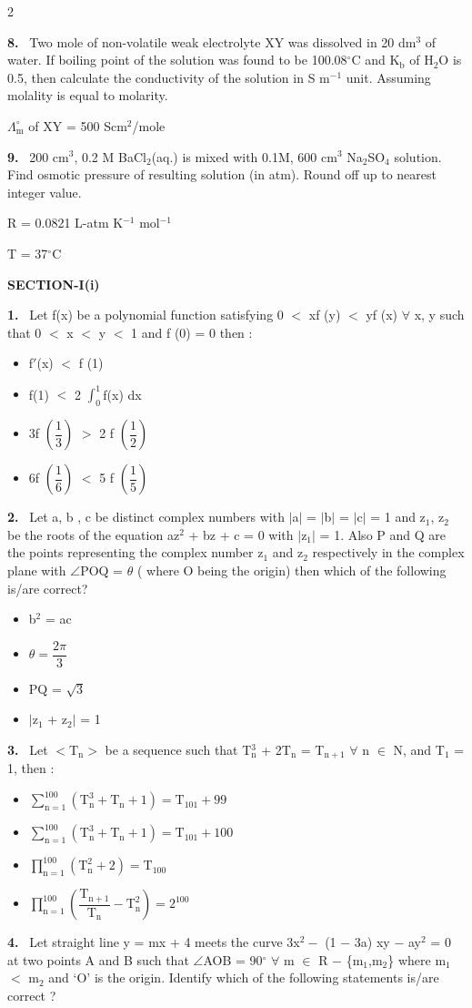 \documentclass[10pt]{extarticle}
\newcommand{\papersec}[1]{\par\bigskip{\centering\Large\bfseries PAPER-#1\par}\medskip}
\newcommand{\partsec}[2]{\par\medskip\noindent{\large\bfseries PART-#1: #2}\par\smallskip}
\newcommand{\sect}[1]{\par\smallskip\noindent\textbf{#1}\par}
\newcommand{\qn}[1]{\par\smallskip\noindent\textbf{#1.}~}
\newenvironment{qoptions}{\begin{itemize}[leftmargin=1.8em,itemsep=1pt,topsep=2pt,label={}]}{\end{itemize}}
\newcommand{\opt}[2]{\item[(#1)] #2}
\begin{document}
\begin{multicols}{2}
\qn{8} Two mole of non-volatile weak electrolyte XY was dissolved in 20 dm$^3$ of water. If boiling point of the solution was found to be 100.08$^\circ$C and K$_\mathrm b$ of H$_2$O is 0.5, then calculate the conductivity of the solution in S m$^{-1}$ unit. Assuming molality is equal to molarity.\par
$\Lambda^\circ_\mathrm m$ of XY = 500 Scm$^2$/mole
\qn{9} 200 cm$^3$, 0.2 M BaCl$_2$(aq.) is mixed with 0.1M, 600 cm$^3$ Na$_2$SO$_4$ solution. Find osmotic pressure of resulting solution (in atm). Round off up to nearest integer value.\par
R = 0.0821 L-atm K$^{-1}$ mol$^{-1}$\par
T = 37$^\circ$C
\raggedcolumns
\papersec{2}
\partsec{3}{MATHEMATICS}
\sect{SECTION-I(i)}
\qn{1} Let f(x) be a polynomial function satisfying 0 $<$ xf (y) $<$ yf (x) $\forall$ x, y such that 0 $<$ x $<$ y $<$ 1 and f (0) = 0 then :
\begin{qoptions}
\opt{A}{f$'$(x) $<$ f (1)}
\opt{B}{f(1) $<$ 2 $\displaystyle\int_0^1$f(x) dx}
\opt{C}{3f $\left(\dfrac13\right)$ $>$ 2 f $\left(\dfrac12\right)$}
\opt{D}{6f $\left(\dfrac16\right)$ $<$ 5 f $\left(\dfrac15\right)$}
\end{qoptions}
\qn{2} Let a, b , c be distinct complex numbers with $|$a$|$ = $|$b$|$ = $|$c$|$ = 1 and z$_1$, z$_2$ be the roots of the equation az$^2$ + bz + c = 0 with $|$z$_1|$ = 1. Also P and Q are the points representing the complex number z$_1$ and z$_2$ respectively in the complex plane with $\angle$POQ = $\theta$ ( where O being the origin) then which of the following is/are correct?
\begin{qoptions}
\opt{A}{b$^2$ = ac}
\opt{B}{$\theta=\dfrac{2\pi}3$}
\opt{C}{PQ = $\sqrt3$}
\opt{D}{$|$z$_1$ + z$_2|$ = 1}
\end{qoptions}
\qn{3} Let $<$T$_\mathrm n>$ be a sequence such that T$_\mathrm n^3$ + 2T$_\mathrm n$ = T$_{\mathrm n+1}$ $\forall$ n $\in$ N, and T$_1$ = 1, then :
\begin{qoptions}
\opt{A}{$\displaystyle\sum_{\mathrm n=1}^{100}(\mathrm T_\mathrm n^3+\mathrm T_\mathrm n+1)=\mathrm T_{101}+99$}
\opt{B}{$\displaystyle\sum_{\mathrm n=1}^{100}(\mathrm T_\mathrm n^3+\mathrm T_\mathrm n+1)=\mathrm T_{101}+100$}
\opt{C}{$\displaystyle\prod_{\mathrm n=1}^{100}\left(\mathrm T_\mathrm n^2+2\right)=\mathrm T_{100}$}
\opt{D}{$\displaystyle\prod_{\mathrm n=1}^{100}\left(\dfrac{\mathrm T_{\mathrm n+1}}{\mathrm T_\mathrm n}-\mathrm T_\mathrm n^2\right)=2^{100}$}
\end{qoptions}
\qn{4} Let straight line y = mx + 4 meets the curve 3x$^2-$ (1 $-$ 3a) xy $-$ ay$^2$ = 0 at two points A and B such that $\angle$AOB = 90$^\circ$ $\forall$ m $\in$ R $-$ \{m$_1$,m$_2$\} where m$_1$ $<$ m$_2$ and `O' is the origin. Identify which of the following statements is/are correct ?

\end{multicols}
\end{document}
